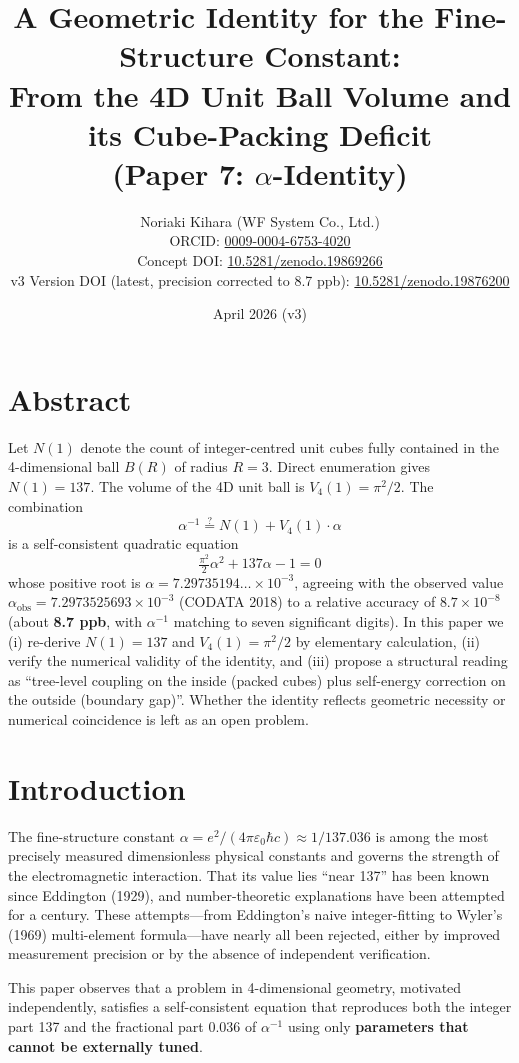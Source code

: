 \documentclass[a4paper,11pt]{article}
\title{A Geometric Identity for the Fine-Structure Constant: \\ From the 4D Unit Ball Volume and its Cube-Packing Deficit \\ \large (Paper 7: $\alpha$-Identity)}
\author{Noriaki Kihara (WF System Co., Ltd.) \\ ORCID: \href{https://orcid.org/0009-0004-6753-4020}{0009-0004-6753-4020} \\ Concept DOI: \href{https://doi.org/10.5281/zenodo.19869266}{10.5281/zenodo.19869266} \\ v3 Version DOI (latest, precision corrected to 8.7 ppb): \href{https://doi.org/10.5281/zenodo.19876200}{10.5281/zenodo.19876200}}
\date{April 2026 (v3)}
\begin{document}
\maketitle

\section*{Abstract}

Let $N(1)$ denote the count of integer-centred unit cubes fully contained in the 4-dimensional ball $B(R)$ of radius $R = 3$. Direct enumeration gives $N(1) = 137$. The volume of the 4D unit ball is $V_4(1) = \pi^2/2$. The combination
\[ \alpha^{-1} \stackrel{?}{=} N(1) + V_4(1) \cdot \alpha \]
is a self-consistent quadratic equation
\[ \tfrac{\pi^2}{2}\alpha^2 + 137 \alpha - 1 = 0 \]
whose positive root is $\alpha = 7.29735194\ldots \times 10^{-3}$, agreeing with the observed value $\alpha_{\text{obs}} = 7.2973525693 \times 10^{-3}$ (CODATA 2018) to a relative accuracy of $8.7 \times 10^{-8}$ (about \textbf{8.7 ppb}, with $\alpha^{-1}$ matching to seven significant digits). In this paper we (i) re-derive $N(1) = 137$ and $V_4(1) = \pi^2/2$ by elementary calculation, (ii) verify the numerical validity of the identity, and (iii) propose a structural reading as ``tree-level coupling on the inside (packed cubes) plus self-energy correction on the outside (boundary gap)''. Whether the identity reflects geometric necessity or numerical coincidence is left as an open problem.

\section{Introduction}

The fine-structure constant $\alpha = e^2/(4\pi\varepsilon_0 \hbar c) \approx 1/137.036$ is among the most precisely measured dimensionless physical constants and governs the strength of the electromagnetic interaction. That its value lies ``near 137'' has been known since Eddington (1929), and number-theoretic explanations have been attempted for a century. These attempts---from Eddington's naive integer-fitting to Wyler's (1969) multi-element formula---have nearly all been rejected, either by improved measurement precision or by the absence of independent verification.

This paper observes that a problem in 4-dimensional geometry, motivated independently, satisfies a self-consistent equation that reproduces both the integer part 137 and the fractional part 0.036 of $\alpha^{-1}$ using only \textbf{parameters that cannot be externally tuned}.
\end{document}
